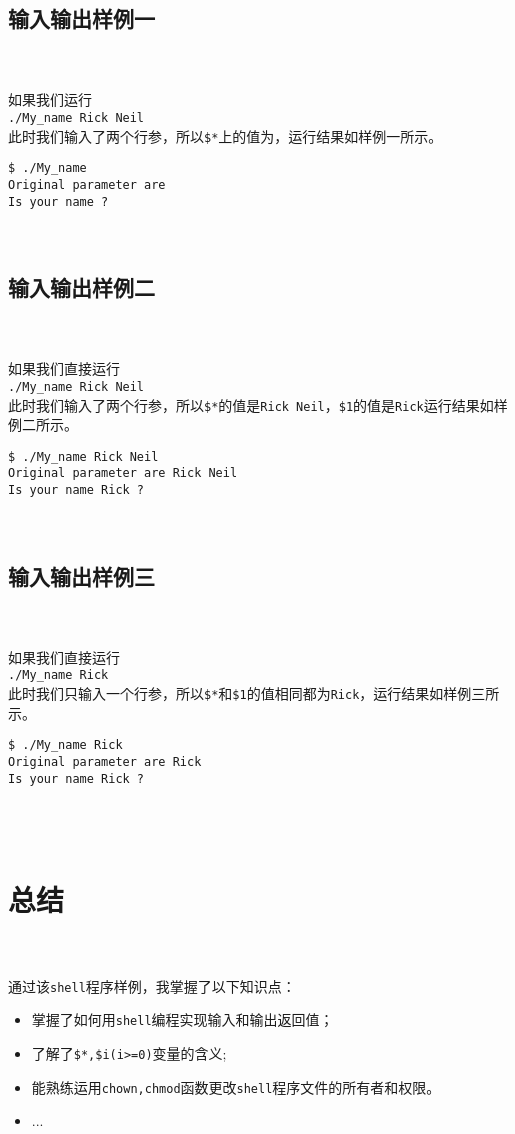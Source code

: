 \documentclass{ctexart}
\begin{document}
\subsection{输入输出样例一}
~\\
\\如果我们运行
\\\verb|./My_name Rick Neil|
\\此时我们输入了两个行参，所以\verb|$*|上的值为，运行结果如样例一所示。
\begin{verbatim}
$ ./My_name
Original parameter are
Is your name ?
\end{verbatim}
~\\

\subsection{输入输出样例二}
~\\
\\如果我们直接运行
\\\verb|./My_name Rick Neil|
\\此时我们输入了两个行参，所以\verb|$*|的值是\verb|Rick Neil|，\verb|$1|的值是\verb|Rick|运行结果如样例二所示。
\begin{verbatim}
$ ./My_name Rick Neil
Original parameter are Rick Neil
Is your name Rick ?
\end{verbatim}
~\\

\subsection{输入输出样例三}
~\\
\\如果我们直接运行
\\\verb|./My_name Rick|
\\此时我们只输入一个行参，所以\verb|$*|和\verb|$1|的值相同都为\verb|Rick|，运行结果如样例三所示。
\begin{verbatim}
$ ./My_name Rick
Original parameter are Rick
Is your name Rick ?
\end{verbatim}
~\\
~\\

\section{总结}
~\\
\\通过该\verb|shell|程序样例，我掌握了以下知识点：
~\\
\begin{itemize}
\item 掌握了如何用\verb|shell|编程实现输入和输出返回值；
\item 了解了\verb|$*,$i(i>=0)|变量的含义;
\item 能熟练运用\verb|chown,chmod|函数更改\verb|shell|程序文件的所有者和权限。
\item ...
\end{itemize}





\end{document}
